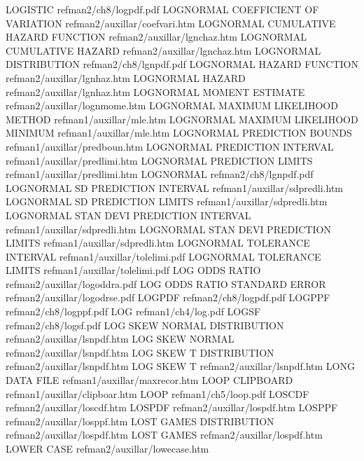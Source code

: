 LOGISTIC                                refman2/ch8/logpdf.pdf
LOGNORMAL COEFFICIENT OF VARIATION      refman2/auxillar/coefvari.htm
LOGNORMAL CUMULATIVE HAZARD FUNCTION    refman2/auxillar/lgnchaz.htm
LOGNORMAL CUMULATIVE HAZARD             refman2/auxillar/lgnchaz.htm
LOGNORMAL DISTRIBUTION                  refman2/ch8/lgnpdf.pdf
LOGNORMAL HAZARD FUNCTION               refman2/auxillar/lgnhaz.htm
LOGNORMAL HAZARD                        refman2/auxillar/lgnhaz.htm
LOGNORMAL MOMENT ESTIMATE               refman2/auxillar/lognmome.htm
LOGNORMAL MAXIMUM LIKELIHOOD METHOD     refman1/auxillar/mle.htm
LOGNORMAL MAXIMUM LIKELIHOOD MINIMUM    refman1/auxillar/mle.htm
LOGNORMAL PREDICTION BOUNDS             refman1/auxillar/predboun.htm
LOGNORMAL PREDICTION INTERVAL           refman1/auxillar/predlimi.htm
LOGNORMAL PREDICTION LIMITS             refman1/auxillar/predlimi.htm
LOGNORMAL                               refman2/ch8/lgnpdf.pdf
LOGNORMAL SD PREDICTION INTERVAL        refman1/auxillar/sdpredli.htm
LOGNORMAL SD PREDICTION LIMITS          refman1/auxillar/sdpredli.htm
LOGNORMAL STAN DEVI PREDICTION INTERVAL refman1/auxillar/sdpredli.htm
LOGNORMAL STAN DEVI PREDICTION LIMITS   refman1/auxillar/sdpredli.htm
LOGNORMAL TOLERANCE INTERVAL            refman1/auxillar/tolelimi.pdf
LOGNORMAL TOLERANCE LIMITS              refman1/auxillar/tolelimi.pdf
LOG ODDS RATIO                          refman2/auxillar/logoddra.pdf
LOG ODDS RATIO STANDARD ERROR           refman2/auxillar/logodrse.pdf
LOGPDF                                  refman2/ch8/logpdf.pdf
LOGPPF                                  refman2/ch8/logppf.pdf
LOG                                     refman1/ch4/log.pdf
LOGSF                                   refman2/ch8/logsf.pdf
LOG SKEW NORMAL DISTRIBUTION            refman2/auxillar/lsnpdf.htm
LOG SKEW NORMAL                         refman2/auxillar/lsnpdf.htm
LOG SKEW T DISTRIBUTION                 refman2/auxillar/lsnpdf.htm
LOG SKEW T                              refman2/auxillar/lsnpdf.htm
LONG DATA FILE                          refman1/auxillar/maxrecor.htm
LOOP CLIPBOARD                          refman1/auxillar/clipboar.htm
LOOP                                    refman1/ch5/loop.pdf
LOSCDF                                  refman2/auxillar/loscdf.htm
LOSPDF                                  refman2/auxillar/lospdf.htm
LOSPPF                                  refman2/auxillar/losppf.htm
LOST GAMES DISTRIBUTION                 refman2/auxillar/lospdf.htm
LOST GAMES                              refman2/auxillar/lospdf.htm
LOWER CASE                              refman2/auxillar/lowecase.htm

